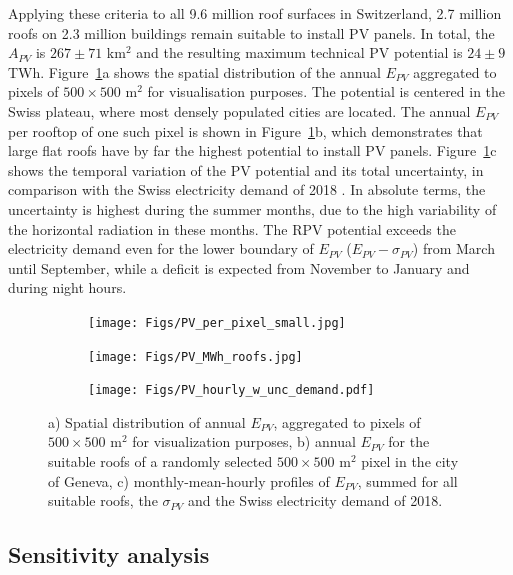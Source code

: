 Applying these criteria to all 9.6 million roof surfaces in Switzerland, 2.7 million roofs on 2.3 million buildings remain suitable to install PV panels. 
In total, the $A_{PV}$ is $267 \pm 71$ km$^2$ and the resulting maximum technical PV potential is $24 \pm 9$ TWh. Figure~\ref{fig:results}a shows the spatial distribution of the annual $E_{PV}$ aggregated to pixels of $500 \times 500$ m$^2$ for visualisation purposes. The potential is centered in the Swiss plateau, where most densely populated cities are located.
%
The annual $E_{PV}$ per rooftop of one such pixel is shown in Figure~\ref{fig:results}b, which demonstrates that large flat roofs have by far the highest potential to install PV panels.
%
Figure~\ref{fig:results}c shows the temporal variation of the PV potential and its total uncertainty, in comparison with the Swiss electricity demand of 2018 \cite{swissgrid_production_2019}. In absolute terms, the uncertainty is highest during the summer months, due to the high variability of the horizontal radiation in these months. The RPV potential exceeds the electricity demand even for the lower boundary of $E_{PV}$ ($E_{PV} - \sigma_{PV}$) from March until September, while a deficit is expected from November to January and during night hours. 

\begin{figure}[t]
\centering
\begin{subfigure}{.63\textwidth}
  \centering
  \texttt{[image: Figs/PV\_per\_pixel\_small.jpg]}
  \subcaption{}
\end{subfigure}
\begin{subfigure}{.34\textwidth}
  \centering
  \texttt{[image: Figs/PV\_MWh\_roofs.jpg]}
  \subcaption{}
\end{subfigure}
\begin{subfigure}{.95\textwidth}
  \centering
  \texttt{[image: Figs/PV\_hourly\_w\_unc\_demand.pdf]} 
  \subcaption{}
\end{subfigure}
\caption{a) Spatial distribution of annual $E_{PV}$, aggregated to pixels of $500 \times 500$ m$^2$ for visualization purposes, 
b) annual $E_{PV}$ for the suitable roofs of a randomly selected $500 \times 500$ m$^2$ pixel in the city of Geneva,
c) monthly-mean-hourly profiles of $E_{PV}$, summed for all suitable roofs, the $\sigma_{PV}$ and the Swiss electricity demand of 2018.}
\label{fig:results}
\end{figure}

\subsection{Sensitivity analysis}

